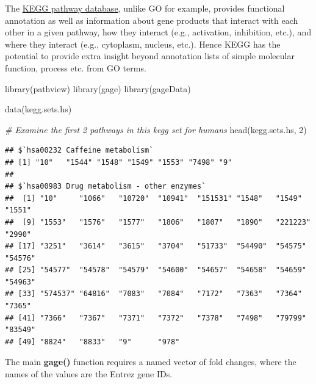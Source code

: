 \documentclass[
]{article}
\newenvironment{Shaded}{\begin{snugshade}}{\end{snugshade}}
\newcommand{\CommentTok}[1]{\textcolor[rgb]{0.56,0.35,0.01}{\textit{#1}}}
\newcommand{\DecValTok}[1]{\textcolor[rgb]{0.00,0.00,0.81}{#1}}
\newcommand{\FunctionTok}[1]{\textcolor[rgb]{0.00,0.00,0.00}{#1}}
\newcommand{\NormalTok}[1]{#1}
\newcommand{\OtherTok}[1]{\textcolor[rgb]{0.56,0.35,0.01}{#1}}
\newcommand{\SpecialCharTok}[1]{\textcolor[rgb]{0.00,0.00,0.00}{#1}}
\begin{document}
The \href{https://www.genome.jp/kegg/pathway.html}{KEGG pathway
database}, unlike GO for example, provides functional annotation as well
as information about gene products that interact with each other in a
given pathway, how they interact (e.g., activation, inhibition, etc.),
and where they interact (e.g., cytoplasm, nucleus, etc.). Hence KEGG has
the potential to provide extra insight beyond annotation lists of simple
molecular function, process etc. from GO terms.

\begin{Shaded}
\begin{Highlighting}[]
\FunctionTok{library}\NormalTok{(pathview)}
\FunctionTok{library}\NormalTok{(gage)}
\FunctionTok{library}\NormalTok{(gageData)}
\end{Highlighting}
\end{Shaded}

\begin{Shaded}
\begin{Highlighting}[]
\FunctionTok{data}\NormalTok{(kegg.sets.hs)}

\CommentTok{\# Examine the first 2 pathways in this kegg set for humans}
\FunctionTok{head}\NormalTok{(kegg.sets.hs, }\DecValTok{2}\NormalTok{)}
\end{Highlighting}
\end{Shaded}

\begin{verbatim}
## $`hsa00232 Caffeine metabolism`
## [1] "10"   "1544" "1548" "1549" "1553" "7498" "9"   
## 
## $`hsa00983 Drug metabolism - other enzymes`
##  [1] "10"     "1066"   "10720"  "10941"  "151531" "1548"   "1549"   "1551"  
##  [9] "1553"   "1576"   "1577"   "1806"   "1807"   "1890"   "221223" "2990"  
## [17] "3251"   "3614"   "3615"   "3704"   "51733"  "54490"  "54575"  "54576" 
## [25] "54577"  "54578"  "54579"  "54600"  "54657"  "54658"  "54659"  "54963" 
## [33] "574537" "64816"  "7083"   "7084"   "7172"   "7363"   "7364"   "7365"  
## [41] "7366"   "7367"   "7371"   "7372"   "7378"   "7498"   "79799"  "83549" 
## [49] "8824"   "8833"   "9"      "978"
\end{verbatim}

The main \textbf{gage()} function requires a named vector of fold
changes, where the names of the values are the Entrez gene IDs.

\begin{Shaded}
\end{Shaded}
\end{document}
